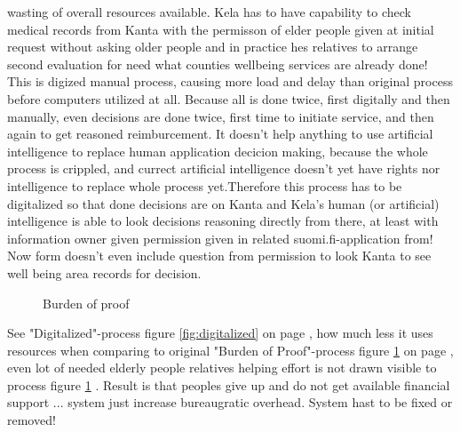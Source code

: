 wasting of overall resources available\allowbreak\cite{
 ElakelElakel}\allowbreak\cite{ElakelaisetEivatTieda}. Kela has to have
capability to check medical records from Kanta with the permisson of elder
people given at initial request without asking older people and in practice
hes relatives to arrange second evaluation for need what counties wellbeing
services are already done! This is digized manual process, causing more load
and delay than original process before computers utilized at all. Because all
is done twice, first digitally and then manually, even decisions are done
twice, first time to initiate service, and then again to get reasoned
reimburcement. It doesn't help anything to use artificial
intelligence\allowbreak\cite{PerukirjaTukiehdotuksetTekoaly} to
replace human application decicion making, because the whole process is
crippled, and currect artificial intelligence doesn't yet have rights nor
intelligence to replace whole process yet.Therefore this process has to be
digitalized so that done decisions are on Kanta and Kela's human (or
artificial) intelligence is able to look decisions reasoning directly from
there, at least with information owner given permission given in related
suomi.fi-application from! Now form doesn't even include question from
permission to look Kanta to see well being area records for
decision\allowbreak\cite{LifeEventDetailDrivenProcessQuides}.

\begin{figure}
 \begin{center}
  \caption{Burden of proof}
  \label{fig:burdofpr}
 \end{center}
\end{figure}

See "Digitalized"-process figure \ref{fig:digitalized} on page
\pageref{fig:digitalized}, how much less it uses resources when comparing to
original "Burden of Proof"-process figure \ref{fig:burdofpr} on page
\pageref{fig:burdofpr}, even lot of needed elderly people relatives helping
effort is not drawn visible to process figure \ref{fig:burdofpr} \cite{
 VMAuroraAiNakokulmiaIhmiskeskeisyyteen}. Result is that peoples give up and
do not get available financial support \cite{ElakelElakel}\allowbreak\cite{
 ElakelaisetEivatTieda}\allowbreak\cite{
 StudentHousingAllowance}\allowbreak\cite{
 Many_Stepwise_Rules_Leads_To_Mess}... system just increase
bureaugratic overhead. System hast to be fixed\allowbreak\cite{
LEX_2025_1159}\allowbreak\cite{EHDS}\allowbreak\cite{
VM_40_2023}\allowbreak\cite{Creatido} or removed\allowbreak\cite{STM061_2025}!

